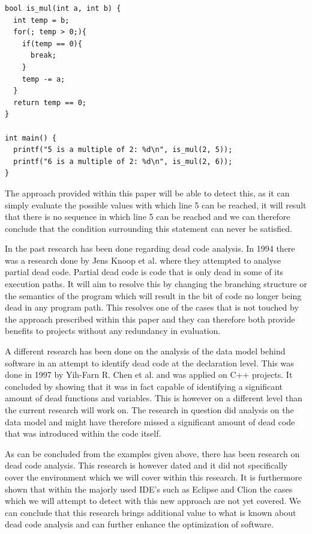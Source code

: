 \documentclass[12pt]{article}
\begin{document}
\begin{lstlisting}[style=CStyle, caption={Example C code where Eclipse and Clion would not identify dead code.}]
bool is_mul(int a, int b) {
  int temp = b;
  for(; temp > 0;){
    if(temp == 0){
      break;
    }
    temp -= a;
  }
  return temp == 0;
}

int main() {
  printf("5 is a multiple of 2: %d\n", is_mul(2, 5));
  printf("6 is a multiple of 2: %d\n", is_mul(2, 6));
}
\end{lstlisting}

The approach provided within this paper will be able to detect this, as it can simply evaluate the possible values with which line 5 can be reached, it will result that there is no sequence in which line 5 can be reached and we can therefore conclude that the condition surrounding this statement can never be satisfied.

In the past research has been done regarding dead code analysis. In 1994 there was a research done by Jens Knoop et al. \cite{10.1145/773473.178256} where they attempted to analyse partial dead code. Partial dead code is code that is only dead in some of its execution paths. It will aim to resolve this by changing the branching structure or the semantics of the program which will result in the bit of code no longer being dead in any program path. This resolves one of the cases that is not touched by the approach prescribed within this paper and they can therefore both provide benefits to projects without any redundancy in evaluation.

A different research has been done on the analysis of the data model behind software in an attempt to identify dead code at the declaration level. This was done in 1997 by Yih-Farn R. Chen et al. \cite{10.1145/267896.267924} and was applied on C++ projects. It concluded by showing that it was in fact capable of identifying a significant amount of dead functions and variables. This is however on a different level than the current research will work on. The research in question did analysis on the data model and might have therefore missed a significant amount of dead code that was introduced within the code itself.

As can be concluded from the examples given above, there has been research on dead code analysis. This research is however dated and it did not specifically cover the environment which we will cover within this research. It is furthermore shown that within the majorly used IDE's such as Eclipse and Clion the cases which we will attempt to detect with this new approach are not yet covered. We can conclude that this research brings additional value to what is known about dead code analysis and can further enhance the optimization of software.
\end{document}
